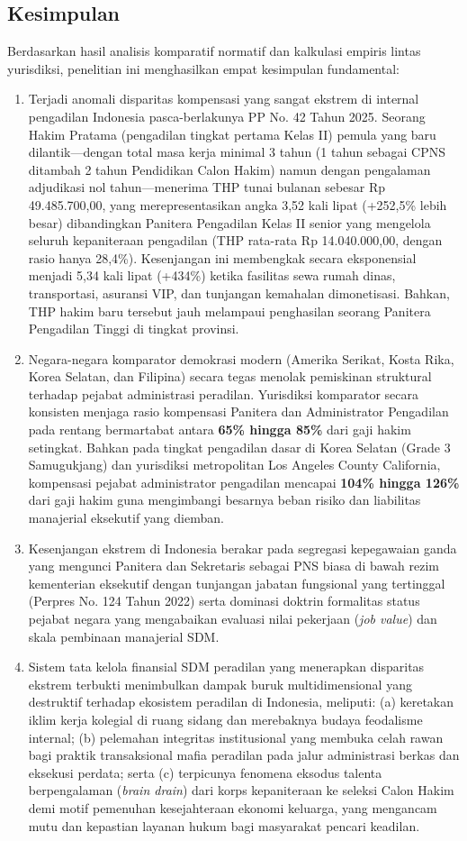 \documentclass[12pt, a4paper]{article}
\begin{document}
\subsection{Kesimpulan}
Berdasarkan hasil analisis komparatif normatif dan kalkulasi empiris lintas yurisdiksi, penelitian ini menghasilkan empat kesimpulan fundamental:
\begin{enumerate}
    \item Terjadi anomali disparitas kompensasi yang sangat ekstrem di internal pengadilan Indonesia pasca-berlakunya PP No. 42 Tahun 2025. Seorang Hakim Pratama (pengadilan tingkat pertama Kelas II) pemula yang baru dilantik---dengan total masa kerja minimal 3 tahun (1 tahun sebagai CPNS ditambah 2 tahun Pendidikan Calon Hakim) namun dengan pengalaman adjudikasi nol tahun---menerima THP tunai bulanan sebesar Rp 49.485.700,00, yang merepresentasikan angka 3,52 kali lipat (+252,5\% lebih besar) dibandingkan Panitera Pengadilan Kelas II senior yang mengelola seluruh kepaniteraan pengadilan (THP rata-rata Rp 14.040.000,00, dengan rasio hanya 28,4\%). Kesenjangan ini membengkak secara eksponensial menjadi 5,34 kali lipat (+434\%) ketika fasilitas sewa rumah dinas, transportasi, asuransi VIP, dan tunjangan kemahalan dimonetisasi. Bahkan, THP hakim baru tersebut jauh melampaui penghasilan seorang Panitera Pengadilan Tinggi di tingkat provinsi.
    \item Negara-negara komparator demokrasi modern (Amerika Serikat, Kosta Rika, Korea Selatan, dan Filipina) secara tegas menolak pemiskinan struktural terhadap pejabat administrasi peradilan. Yurisdiksi komparator secara konsisten menjaga rasio kompensasi Panitera dan Administrator Pengadilan pada rentang bermartabat antara \textbf{65\% hingga 85\%} dari gaji hakim setingkat. Bahkan pada tingkat pengadilan dasar di Korea Selatan (Grade 3 Samugukjang) dan yurisdiksi metropolitan Los Angeles County California, kompensasi pejabat administrator pengadilan mencapai \textbf{104\% hingga 126\%} dari gaji hakim guna mengimbangi besarnya beban risiko dan liabilitas manajerial eksekutif yang diemban.
    \item Kesenjangan ekstrem di Indonesia berakar pada segregasi kepegawaian ganda yang mengunci Panitera dan Sekretaris sebagai PNS biasa di bawah rezim kementerian eksekutif dengan tunjangan jabatan fungsional yang tertinggal (Perpres No. 124 Tahun 2022) serta dominasi doktrin formalitas status pejabat negara yang mengabaikan evaluasi nilai pekerjaan (\textit{job value}) dan skala pembinaan manajerial SDM.
    \item Sistem tata kelola finansial SDM peradilan yang menerapkan disparitas ekstrem terbukti menimbulkan dampak buruk multidimensional yang destruktif terhadap ekosistem peradilan di Indonesia, meliputi: (a) keretakan iklim kerja kolegial di ruang sidang dan merebaknya budaya feodalisme internal; (b) pelemahan integritas institusional yang membuka celah rawan bagi praktik transaksional mafia peradilan pada jalur administrasi berkas dan eksekusi perdata; serta (c) terpicunya fenomena eksodus talenta berpengalaman (\textit{brain drain}) dari korps kepaniteraan ke seleksi Calon Hakim demi motif pemenuhan kesejahteraan ekonomi keluarga, yang mengancam mutu dan kepastian layanan hukum bagi masyarakat pencari keadilan.

\end{enumerate}
\end{document}
